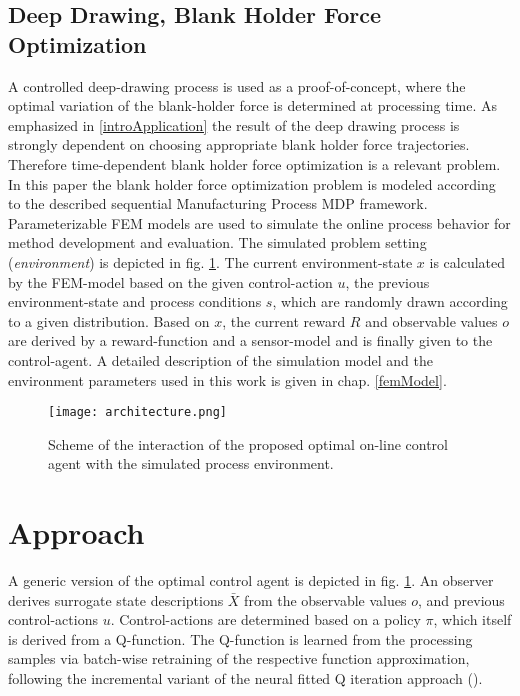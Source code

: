 \subsection{Deep Drawing, Blank Holder Force Optimization}
\label{BHFopt}
A controlled deep-drawing process is used as a proof-of-concept, where the optimal variation of the blank-holder force is determined at processing time. As emphasized in \ref{introApplication} the result of the deep drawing process is strongly dependent on choosing appropriate blank holder force trajectories. Therefore time-dependent blank holder force optimization is a relevant problem. In this paper the blank holder force optimization problem is modeled according to the described sequential Manufacturing Process MDP framework. Parameterizable FEM models are used to simulate the online process behavior for method development and evaluation. The simulated problem setting (\textit{environment}) is depicted in fig. \ref{architecture}. The current environment-state $x$ is calculated by the FEM-model based on the given control-action $u$, the previous environment-state and process conditions $s$, which are randomly drawn according to a given distribution. Based on $x$, the current reward $R$ and observable values $o$ are derived by a reward-function and a sensor-model and is finally given to the control-agent. A detailed description of the simulation model and the environment parameters used in this work is given in chap. \ref{femModel}.

\begin{figure}
	\texttt{[image: architecture.png]}
	\caption{Scheme of the interaction of the proposed optimal on-line control agent with the simulated process environment.}
	\label{architecture}
\end{figure}

\section{Approach}
\label{approach}

A generic version of the optimal control agent is depicted in fig. \ref{architecture}. An observer derives surrogate state descriptions $\bar{X}$ from the observable values $o$, and previous control-actions $u$. Control-actions are determined based on a policy $\pi$, which itself is derived from a Q-function. The Q-function is learned from the processing samples via batch-wise retraining of the respective function approximation, following the incremental variant of the neural fitted Q iteration approach (\cite{Riedmiller2005}). 

